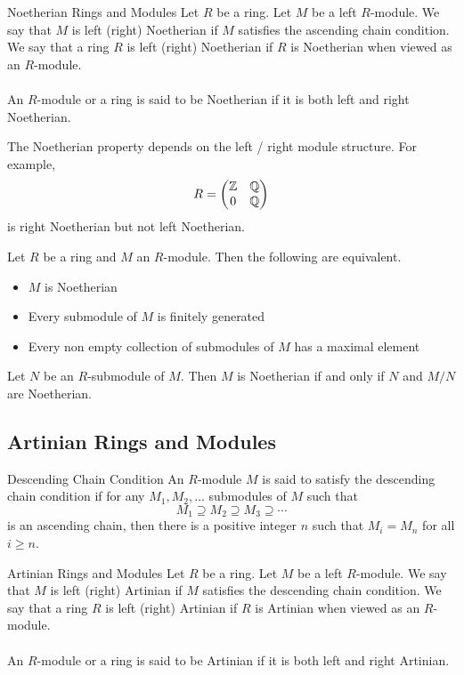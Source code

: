 \documentclass[a4paper]{article}
\begin{document}
\begin{defn}{Noetherian Rings and Modules}{} Let $R$ be a ring. Let $M$ be a left $R$-module. We say that $M$ is left (right) Noetherian if $M$ satisfies the ascending chain condition. We say that a ring $R$ is left (right) Noetherian if $R$ is Noetherian when viewed as an $R$-module. \\~\\

An $R$-module or a ring is said to be Noetherian if it is both left and right Noetherian. 
\end{defn}

The Noetherian property depends on the left / right module structure. For example, $$R=\begin{pmatrix}
\mathbb{Z} & \mathbb{Q}\\
0 & \mathbb{Q}
\end{pmatrix}$$ is right Noetherian but not left Noetherian. 

\begin{prp}{}{} Let $R$ be a ring and $M$ an $R$-module. Then the following are equivalent. 
\begin{itemize}
\item $M$ is Noetherian
\item Every submodule of $M$ is finitely generated
\item Every non empty collection of submodules of $M$ has a maximal element
\end{itemize}
\end{prp}

\begin{prp}{}{} Let $N$ be an $R$-submodule of $M$. Then $M$ is Noetherian if and only if $N$ and $M/N$ are Noetherian. 
\end{prp}

\subsection{Artinian Rings and Modules}
\begin{defn}{Descending Chain Condition}{} An $R$-module $M$ is said to satisfy the descending chain condition if for any $M_1,M_2,\dots$ submodules of $M$ such that $$M_1\supseteq M_2\supseteq M_3\supseteq\cdots$$ is an ascending chain, then there is a positive integer $n$ such that $M_i=M_n$ for all $i\geq n$. 
\end{defn}

\begin{defn}{Artinian Rings and Modules}{} Let $R$ be a ring. Let $M$ be a left $R$-module. We say that $M$ is left (right) Artinian if $M$ satisfies the descending chain condition. We say that a ring $R$ is left (right) Artinian if $R$ is Artinian when viewed as an $R$-module. \\~\\

An $R$-module or a ring is said to be Artinian if it is both left and right Artinian. 
\end{defn}
\end{document}
